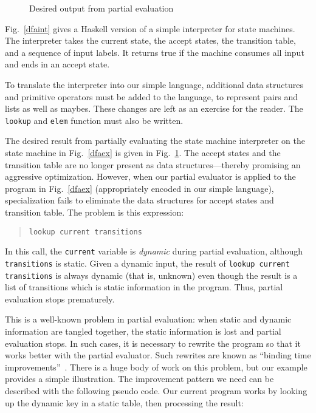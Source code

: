 \documentclass{eptcs}
\begin{document}
\begin{figure}[t!]
 \caption{Desired output from partial evaluation\label{dfaout}}
\bigskip
\end{figure}

Fig.~\ref{dfaint} gives a Haskell version of a simple interpreter for
state machines. The interpreter takes the current state, the accept
states, the transition table, and a sequence of input labels. It
returns true if the machine consumes all input and ends in an accept
state.

To translate the interpreter into our simple language, additional data
structures and primitive operators must be added to the language, to
represent pairs and lists as well as maybes. These changes are left as
an exercise for the reader. The \lstinline{lookup} and
\lstinline{elem} function must also be written.

The desired result from partially evaluating the state machine
interpreter on the state machine in Fig.~\ref{dfaex} is given in
Fig.~\ref{dfaout}. The accept states and the transition table are no
longer present as data structures---thereby promising an aggressive
optimization. However, when our partial evaluator is applied to the
program in Fig.~\ref{dfaex} (appropriately encoded in our simple
language), specialization fails to eliminate the data structures for
accept states and transition table. The problem is this expression:

\begin{quote}
\lstinline{lookup current transitions}
\end{quote}

\noindent
In this call, the \lstinline{current} variable is \textit{dynamic}
during partial evaluation, although \lstinline{transitions} is
static. Given a dynamic input, the result of
\lstinline{lookup current transitions} is always dynamic (that is,
unknown) even though the result is a list of transitions which is
static information in the program. Thus, partial evaluation stops
prematurely.

This is a well-known problem in partial evaluation: when static and
dynamic information are tangled together, the static information is lost
and partial evaluation stops. In such cases, it is necessary to rewrite 
the program so that it works better with the partial evaluator. Such
rewrites are known as ``binding time improvements''~\cite{PartialEvalBookGomard}.
There is a huge body of work on this problem, but our example
provides a simple illustration. The improvement
pattern we need can be described with the following pseudo code.
Our current program works by looking up the dynamic key in a static table, then
processing the result:
\end{document}
